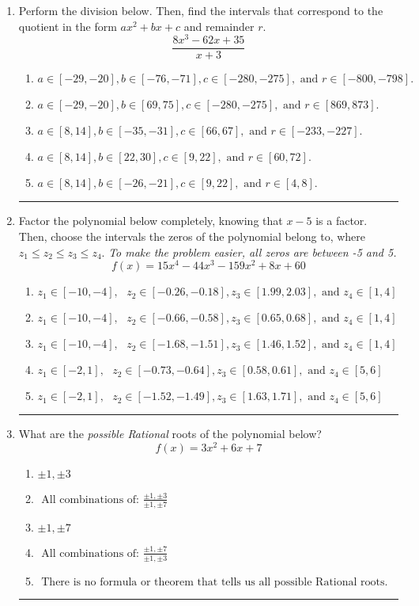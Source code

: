 \documentclass[14pt]{extbook}
\newcommand{\litem}[1]{\item#1\hspace*{-1cm}\rule{\textwidth}{0.4pt}}
\begin{document}
\begin{enumerate}
{\begin{enumerate}[label=\Alph*.]
\end{enumerate} }
\litem{
Perform the division below. Then, find the intervals that correspond to the quotient in the form $ax^2+bx+c$ and remainder $r$.\[ \frac{8x^{3} -62 x + 35}{x + 3} \]\begin{enumerate}[label=\Alph*.]
\item \( a \in [-29, -20], b \in [-76, -71], c \in [-280, -275], \text{ and } r \in [-800, -798]. \)
\item \( a \in [-29, -20], b \in [69, 75], c \in [-280, -275], \text{ and } r \in [869, 873]. \)
\item \( a \in [8, 14], b \in [-35, -31], c \in [66, 67], \text{ and } r \in [-233, -227]. \)
\item \( a \in [8, 14], b \in [22, 30], c \in [9, 22], \text{ and } r \in [60, 72]. \)
\item \( a \in [8, 14], b \in [-26, -21], c \in [9, 22], \text{ and } r \in [4, 8]. \)

\end{enumerate} }
\litem{
Factor the polynomial below completely, knowing that $x -5$ is a factor. Then, choose the intervals the zeros of the polynomial belong to, where $z_1 \leq z_2 \leq z_3 \leq z_4$. \textit{To make the problem easier, all zeros are between -5 and 5.}\[ f(x) = 15x^{4} -44 x^{3} -159 x^{2} +8 x + 60 \]\begin{enumerate}[label=\Alph*.]
\item \( z_1 \in [-10, -4], \text{   }  z_2 \in [-0.26, -0.18], z_3 \in [1.99, 2.03], \text{   and   } z_4 \in [1, 4] \)
\item \( z_1 \in [-10, -4], \text{   }  z_2 \in [-0.66, -0.58], z_3 \in [0.65, 0.68], \text{   and   } z_4 \in [1, 4] \)
\item \( z_1 \in [-10, -4], \text{   }  z_2 \in [-1.68, -1.51], z_3 \in [1.46, 1.52], \text{   and   } z_4 \in [1, 4] \)
\item \( z_1 \in [-2, 1], \text{   }  z_2 \in [-0.73, -0.64], z_3 \in [0.58, 0.61], \text{   and   } z_4 \in [5, 6] \)
\item \( z_1 \in [-2, 1], \text{   }  z_2 \in [-1.52, -1.49], z_3 \in [1.63, 1.71], \text{   and   } z_4 \in [5, 6] \)

\end{enumerate} }
\litem{
What are the \textit{possible Rational} roots of the polynomial below?\[ f(x) = 3x^{2} +6 x + 7 \]\begin{enumerate}[label=\Alph*.]
\item \( \pm 1,\pm 3 \)
\item \( \text{ All combinations of: }\frac{\pm 1,\pm 3}{\pm 1,\pm 7} \)
\item \( \pm 1,\pm 7 \)
\item \( \text{ All combinations of: }\frac{\pm 1,\pm 7}{\pm 1,\pm 3} \)
\item \( \text{ There is no formula or theorem that tells us all possible Rational roots.} \)


\end{enumerate}}
\end{enumerate}
\end{document}

